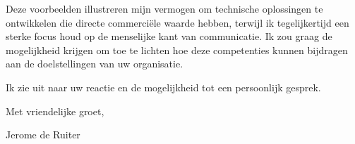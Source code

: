 \documentclass[11pt,a4paper]{article}
\begin{document}
\vspace{1.5em}

Deze voorbeelden illustreren mijn vermogen om technische oplossingen te ontwikkelen die directe commerciële waarde hebben, terwijl ik tegelijkertijd een sterke focus houd op de menselijke kant van communicatie. Ik zou graag de mogelijkheid krijgen om toe te lichten hoe deze competenties kunnen bijdragen aan de doelstellingen van uw organisatie.

Ik zie uit naar uw reactie en de mogelijkheid tot een persoonlijk gesprek.

\vspace{1em}

Met vriendelijke groet,

\vspace{2em}

Jerome de Ruiter
\end{document}
